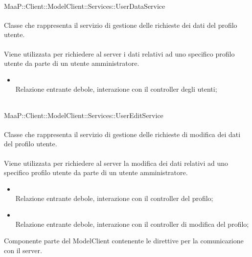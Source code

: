 \\
MaaP::Client::ModelClient::Services::UserDataService\\
\\
Classe che rappresenta il servizio di gestione delle richieste dei dati del profilo utente.\\
\\
Viene utilizzata per richiedere al server i dati relativi ad uno specifico profilo utente da parte di un utente amministratore.\\
\begin{itemize}
\item{}\\
Relazione entrante debole, interazione con il controller degli utenti;
\end{itemize}

\\
MaaP::Client::ModelClient::Services::UserEditService\\
\\
Classe che rappresenta il servizio di gestione delle richieste di modifica dei dati del profilo utente.\\
\\
Viene utilizzata per richiedere al server la modifica dei dati relativi ad uno specifico profilo utente da parte di un utente amministratore.\\
\begin{itemize}
\item{}\\
Relazione entrante debole, interazione con il controller del profilo;
\item{}\\
Relazione entrante debole, interazione con il controller di modifica del profilo;
\end{itemize}

Componente parte del ModelClient contenente le direttive per la comunicazione con il server.


